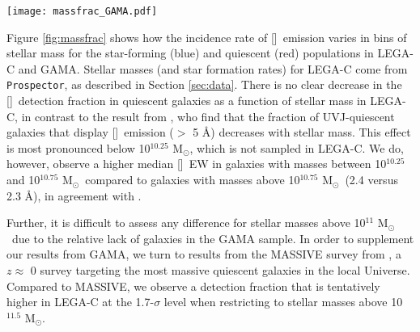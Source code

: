 \documentclass[twocolumn,natbib,iop,hyperref]{aastex62}
\newcommand{\msol}{M$_{\odot}$}
\newcommand{\oii}{[\ion{O}{2}]}
\begin{document}
\begin{figure*}%
\begin{center}
\texttt{[image: massfrac\_GAMA.pdf]}
\caption{Fraction of galaxies with \oii\ EW in excess of 1.5 \AA\ in bins of stellar mass (left) and redshift (right).  Error bars are based on bootstrapping the samples, except in the case of MASSIVE (at $z\approx$ 0) where they are Poisson.  The incidence rate of \oii\ emission does not strongly depend on stellar mass, although GAMA has a very limited number of quiescent galaxies above 10$^{11}$ \msol.  However, the 1.7-$\sigma$ tension between LEGA-C and MASSIVE at stellar masses above 10$^{11.5}$ \msol\ and the presence of \oii\ in the stacked spectra of low-EW LEGA-C sources implies that the increase in detection fraction with redshift could be a physical effect.}
\label{fig:massfrac}
\end{center}
\end{figure*}

Figure \ref{fig:massfrac} shows how the incidence rate of \oii\ emission varies in bins of stellar mass for the star-forming (blue) and quiescent (red) populations in  LEGA-C and GAMA.  Stellar masses (and star formation rates) for LEGA-C come from \texttt{Prospector}, as described in Section \ref{sec:data}.  There is no clear decrease in the \oii\ detection fraction in quiescent galaxies as a function of stellar mass in LEGA-C, in contrast to the result from \citet{2013AA...558A..61M}, who find that the fraction of UVJ-quiescent galaxies that display \oii\ emission ($>$ 5 \AA) decreases with stellar mass.  This effect is most pronounced below 10$^{10.25}$ \msol, which is not sampled in LEGA-C.  We do, however, observe a higher median \oii\ EW in galaxies with masses between 10$^{10.25}$ and 10$^{10.75}$ \msol\ compared to galaxies with masses above 10$^{10.75}$ \msol\ (2.4 versus 2.3 \AA), in agreement with \citet{2013AA...558A..61M}.

Further, it is difficult to assess any difference for stellar masses above 10$^{11}$ \msol\ due to the relative lack of galaxies in the GAMA sample.  In order to supplement our results from GAMA, we turn to results from the MASSIVE survey from \citet{2017ApJ...837...40P}, a $z\approx$ 0 survey targeting the most massive quiescent galaxies in the local Universe.  Compared to MASSIVE, we observe a detection fraction that is tentatively higher in LEGA-C at the 1.7-$\sigma$ level when restricting to stellar masses above 10$^{11.5}$ \msol. 
\end{document}

